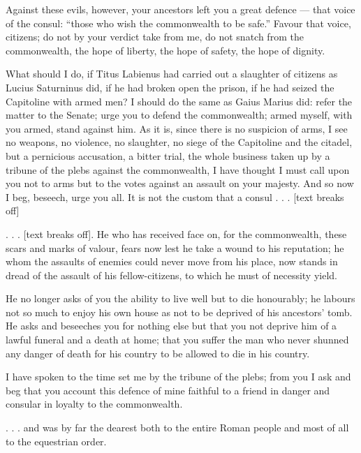  Against these evils, however, your ancestors left you a great defence --- that voice of the consul: ``those who wish the commonwealth to be safe.'' Favour that voice, citizens; do not by your verdict take from me, do not snatch from the commonwealth, the hope of liberty, the hope of safety, the hope of dignity.

 What should I do, if Titus Labienus had carried out a slaughter of citizens as Lucius Saturninus did, if he had broken open the prison, if he had seized the Capitoline with armed men? I should do the same as Gaius Marius did: refer the matter to the Senate; urge you to defend the commonwealth; armed myself, with you armed, stand against him. As it is, since there is no suspicion of arms, I see no weapons, no violence, no slaughter, no siege of the Capitoline and the citadel, but a pernicious accusation, a bitter trial, the whole business taken up by a tribune of the plebs against the commonwealth, I have thought I must call upon you not to arms but to the votes against an assault on your majesty. And so now I beg, beseech, urge you all. It is not the custom that a consul . . .  [text breaks off]

 . . . [text breaks off]. He who has received face on, for the commonwealth, these scars and marks of valour, fears now lest he take a wound to his reputation; he whom the assaults of enemies could never move from his place, now stands in dread of the assault of his fellow-citizens, to which he must of necessity yield.

 He no longer asks of you the ability to live well but to die honourably; he labours not so much to enjoy his own house as not to be deprived of his ancestors' tomb. He asks and beseeches you for nothing else but that you not deprive him of a lawful funeral and a death at home; that you suffer the man who never shunned any danger of death for his country to be allowed to die in his country.

 I have spoken to the time set me by the tribune of the plebs; from you I ask and beg that you account this defence of mine faithful to a friend in danger and consular in loyalty to the commonwealth.

 . . . and was by far the dearest both to the entire Roman people and most of all to the equestrian order.
